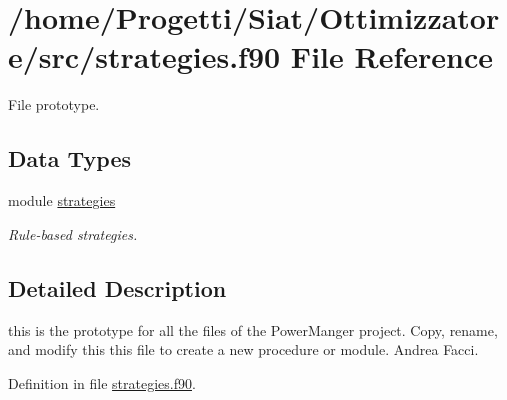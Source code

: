 \hypertarget{strategies_8f90}{\section{/home/\-Progetti/\-Siat/\-Ottimizzatore/src/strategies.f90 File Reference}
\label{strategies_8f90}
}


File prototype.  


\subsection*{Data Types}
\begin{DoxyCompactItemize}
\item 
module \hyperlink{classstrategies}{strategies}
\begin{DoxyCompactList}\small\item\em Rule-\/based strategies. \end{DoxyCompactList}\end{DoxyCompactItemize}


\subsection{Detailed Description}
this is the prototype for all the files of the Power\-Manger project. Copy, rename, and modify this this file to create a new procedure or module.  Andrea Facci. 

Definition in file \hyperlink{strategies_8f90_source}{strategies.\-f90}.

